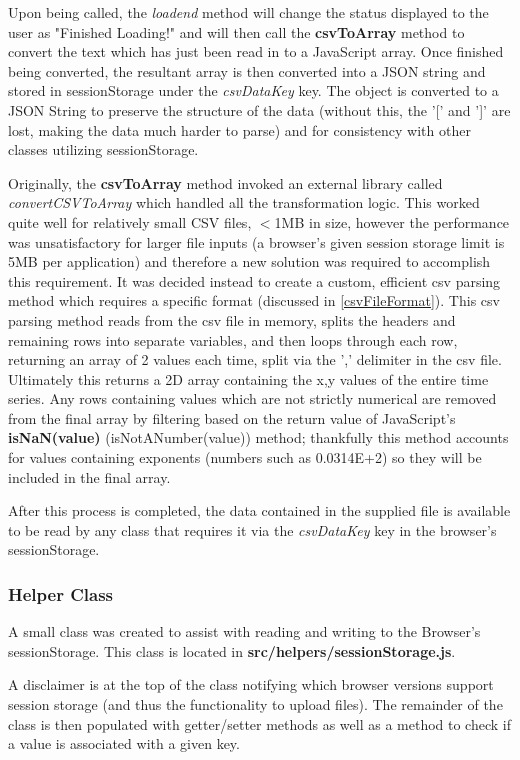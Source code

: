 Upon being called, the {\it loadend} method will change the status displayed to the user as "Finished Loading!" and will then call the {\bf csvToArray} method to convert the text which has just been read in to a JavaScript array. Once finished being converted, the resultant array is then converted into a JSON string and stored in sessionStorage under the {\it csvDataKey} key. The object is converted to a JSON String to preserve the structure of the data (without this, the '[' and ']' are lost, making the data much harder to parse) and for consistency with other classes utilizing sessionStorage.

Originally, the {\bf csvToArray} method invoked an external library called {\it convertCSVToArray} which handled all the transformation logic. This worked quite well for relatively small CSV files, $<$1MB in size, however the performance was unsatisfactory for larger file inputs (a browser's given session storage limit is 5MB per application) and therefore a new solution was required to accomplish this requirement. It was decided instead to create a custom, efficient csv parsing method which requires a specific format (discussed in \ref{csvFileFormat}). This csv parsing method reads from the csv file in memory, splits the headers and remaining rows into separate variables, and then loops through each row, returning an array of 2 values each time, split via the ',' delimiter in the csv file. Ultimately this returns a 2D array containing the x,y values of the entire time series. Any rows containing values which are not strictly numerical are removed from the final array by filtering based on the return value of JavaScript's {\bf isNaN(value)} (isNotANumber(value)) method; thankfully this method accounts for values containing exponents (numbers such as 0.0314E+2) so they will be included in the final array. 

After this process is completed, the data contained in the supplied file is available to be read by any class that requires it via the {\it csvDataKey} key in the browser's sessionStorage. 

\subsubsection{Helper Class}
A small class was created to assist with reading and writing to the Browser's sessionStorage. This class is located in {\bf src/helpers/sessionStorage.js}.

A disclaimer is at the top of the class notifying which browser versions support session storage (and thus the functionality to upload files). The remainder of the class is then populated with getter/setter methods as well as a method to check if a value is associated with a given key. 

